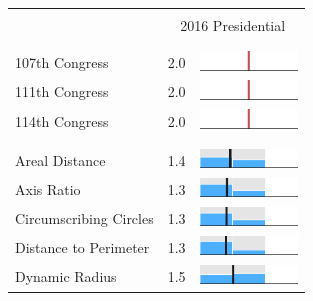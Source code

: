 
\begin{table}
\renewcommand{\arraystretch}{0.7}
 \begin{tabular}{l rm{7em}}
\hline \hline \\

{} & \multicolumn{2}{c}{2016 Presidential} \\

\\ \hline \\
107th Congress         &   2.0 &          \includegraphics[width=7em]{mini_hist/TN_2016_107} \\
111th Congress         &   2.0 &          \includegraphics[width=7em]{mini_hist/TN_2016_111} \\
114th Congress         &   2.0 &          \includegraphics[width=7em]{mini_hist/TN_2016_114} \\
\\ \hline \\ 
Areal Distance         &   1.4 &       \includegraphics[width=7em]{mini_hist/TN_2016_dist_a} \\
Axis Ratio             &   1.3 &   \includegraphics[width=7em]{mini_hist/TN_2016_axis_ratio} \\
Circumscribing Circles &   1.3 &        \includegraphics[width=7em]{mini_hist/TN_2016_reock} \\
Distance to Perimeter  &   1.3 &     \includegraphics[width=7em]{mini_hist/TN_2016_rohrbach} \\
Dynamic Radius         &   1.5 &   \includegraphics[width=7em]{mini_hist/TN_2016_dyn_radius} \\

\end{tabular}
\end{table}
